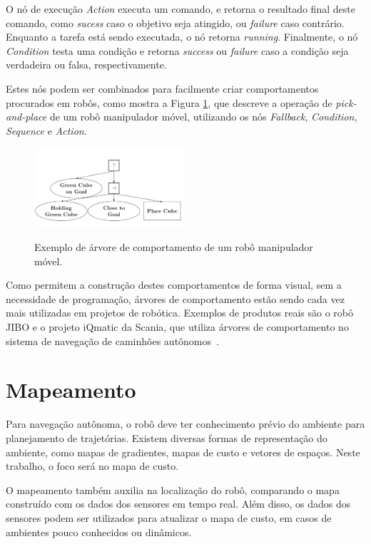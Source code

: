 \documentclass[repeatfields,xlists,xpacks,oneside,yearsonly]{ufrgscca}
\begin{document}
O nó de execução \textit{Action} executa um comando, e retorna o resultado final deste comando,
como \textit{sucess} caso o objetivo seja atingido, ou \textit{failure} caso contrário.
Enquanto a tarefa está sendo executada, o nó retorna \textit{running}.
Finalmente, o nó \textit{Condition} testa uma condição e retorna \textit{success} ou \textit{failure}
caso a condição	seja verdadeira ou falsa, respectivamente.

Estes nós podem ser combinados para facilmente criar comportamentos
procurados em robôs, como mostra a Figura \ref{fig:bt_exemplo},
que descreve a operação de \textit{pick-and-place} de um robô manipulador móvel,
utilizando os nós \textit{Fallback}, \textit{Condition},
\textit{Sequence} e \textit{Action}.

\begin{figure}[htbp]
    {
        \centering
        \caption{Exemplo de árvore de comportamento de um robô manipulador móvel.}
        \label{fig:bt_exemplo}
        \includegraphics[width=0.5\textwidth]{bt_exemplo.png}\\
    }
    {}
\end{figure}

Como permitem a construção destes comportamentos de forma visual, sem a
necessidade de programação, árvores de comportamento estão sendo cada
vez mais utilizadas em projetos de robótica. Exemplos de produtos
reais são o robô JIBO e o projeto iQmatic da Scania, que
utiliza árvores de comportamento no sistema de navegação de caminhões
autônomos~\cite{BehaviorTree}.

\section{Mapeamento}

Para navegação autônoma, o robô deve ter conhecimento prévio do ambiente
para planejamento de trajetórias.
Existem diversas formas de representação do ambiente,
como mapas de gradientes, mapas de custo e vetores de espaços.
Neste trabalho, o foco será no mapa de custo.

O mapeamento também auxilia na localização do robô, comparando o mapa construído
com os dados dos sensores em tempo real. Além disso, os dados dos sensores podem ser
utilizados para atualizar o mapa de custo, em casos de ambientes pouco conhecidos ou dinâmicos.
\end{document}
